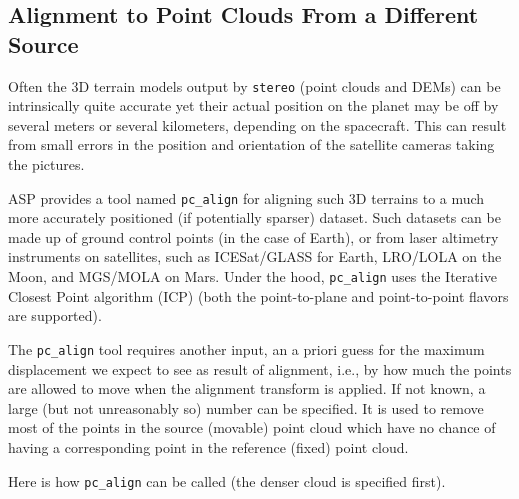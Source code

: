 \subsection{Alignment to Point Clouds From a Different Source}
\label{pc-align-example}
Often the 3D terrain models output by \texttt{stereo} (point
clouds and DEMs) can be intrinsically quite accurate yet their actual
position on the planet may be off by several meters or several
kilometers, depending on the spacecraft. This can result from small
errors in the position and orientation of the satellite cameras taking
the pictures.

ASP provides a tool named \texttt{pc\_align} for aligning such 3D
terrains to a much more accurately positioned (if potentially sparser)
dataset. Such datasets can be made up of ground control points (in the
case of Earth), or from laser altimetry instruments on satellites, such
as ICESat/GLASS for Earth, LRO/LOLA on the Moon, and MGS/MOLA on Mars.
Under the hood, \texttt{pc\_align} uses the Iterative Closest Point
algorithm (ICP) (both the point-to-plane and point-to-point flavors are supported).

The \texttt{pc\_align} tool requires another input, an a priori guess for
the maximum displacement we expect to see as result of alignment, i.e.,
by how much the points are allowed to move when the alignment transform is
applied. If not known, a large (but not unreasonably so) number can be
specified. It is used to remove most of the points in the source
(movable) point cloud which have no chance of having a corresponding
point in the reference (fixed) point cloud.

Here is how \texttt{pc\_align} can be called (the denser cloud is
specified first).

